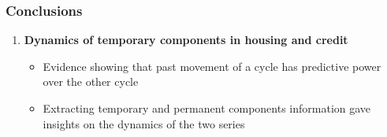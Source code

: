 \documentclass[10pt]{beamer}
\begin{document}
\begin{frame}
	\frametitle{Conclusions}
	
	\begin{enumerate}
		\item \textbf{Dynamics of temporary components in housing and credit}
		\begin{itemize}
			\item Evidence showing that past movement of a cycle has predictive power over the other cycle
			\item Extracting temporary and permanent components information gave insights on the dynamics of the two series
		\end{itemize} 
		
		
		\bigskip
		
			

\end{enumerate}
\end{frame}
\end{document}
